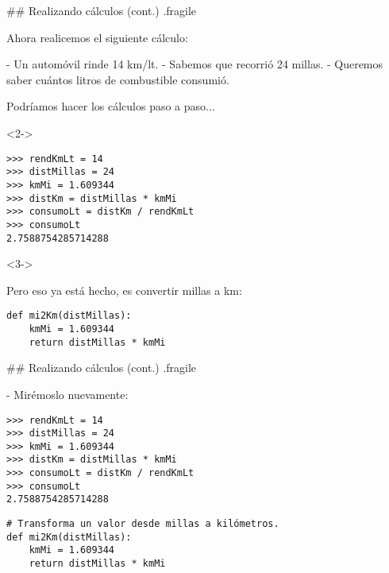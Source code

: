 ## Realizando cálculos (cont.) {.fragile}

Ahora realicemos el siguiente cálculo:

- Un automóvil rinde 14 km/lt.
- Sabemos que recorrió 24 millas.
- Queremos saber cuántos litros de combustible consumió.

\vspace{-.6ex}
\bgnblocknormal
Podríamos hacer los cálculos paso a paso...
\trmblocknormal

\begin{onlyenv}<2->

\bgncolumns
{}

\begin{lstlisting}[linebackgroundcolor={%
        \btLstHL<3->{3-4}%
}]
>>> rendKmLt = 14
>>> distMillas = 24
>>> kmMi = 1.609344
>>> distKm = distMillas * kmMi
>>> consumoLt = distKm / rendKmLt
>>> consumoLt
2.7588754285714288
\end{lstlisting}


<3->

\bgnblockalert
\footnotesize Pero eso ya está hecho, es convertir millas a km:
\trmblockalert


\begin{lstlisting}[linebackgroundcolor={ \btLstHL{1-3} }]
def mi2Km(distMillas):
	kmMi = 1.609344
	return distMillas * kmMi
\end{lstlisting}


\trmcolumns

\end{onlyenv}


## Realizando cálculos (cont.) {.fragile}

- Mirémoslo nuevamente:

\vspace{-2ex}

\bgncolumns
{}
\begin{lstlisting}[linebackgroundcolor={%
        \btLstHL{3-4}%
}]
>>> rendKmLt = 14
>>> distMillas = 24
>>> kmMi = 1.609344
>>> distKm = distMillas * kmMi
>>> consumoLt = distKm / rendKmLt
>>> consumoLt
2.7588754285714288
\end{lstlisting}



\begin{lstlisting}[linebackgroundcolor={%
        \btLstHL{2-4}%
}]
# Transforma un valor desde millas a kilómetros.
def mi2Km(distMillas):
    kmMi = 1.609344
    return distMillas * kmMi
\end{lstlisting}

